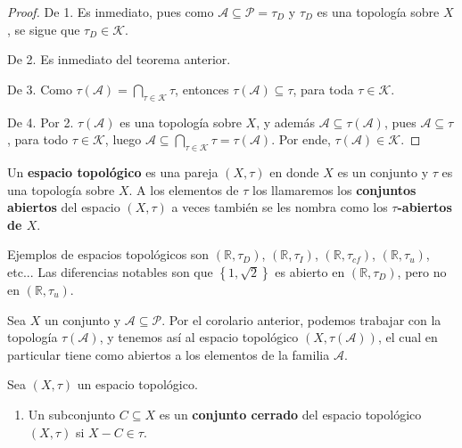 \documentclass[12pt]{report}
\theoremstyle{largebreak}
\begin{document}
    \begin{proof}
        De 1. Es inmediato, pues como $\mathcal{A}\subseteq\mathcal{P}=\tau_D$ y $\tau_D$ es una topología sobre $X$, se sigue que $\tau_D\in\mathcal{K}$.

        De 2. Es inmediato del teorema anterior.

        De 3. Como $\tau(\mathcal{A})=\bigcap_{\tau\in\mathcal{K}}\tau$, entonces $\tau(\mathcal{A})\subseteq\tau$, para toda $\tau\in\mathcal{K}$.

        De 4. Por 2. $\tau(\mathcal{A})$ es una topología sobre $X$, y además $\mathcal{A}\subseteq\tau(\mathcal{A})$, pues $\mathcal{A}\subseteq\tau$, para todo $\tau\in\mathcal{K}$, luego $\mathcal{A}\subseteq\bigcap_{\tau\in\mathcal{K}}\tau=\tau(\mathcal{A})$. Por ende, $\tau(\mathcal{A})\in\mathcal{K}$.
    \end{proof}

    \begin{mydef}
        Un \textbf{espacio topológico} es una pareja $(X,\tau)$ en donde $X$ es un conjunto y $\tau$ es una topología sobre $X$. A los elementos de $\tau$ los llamaremos los \textbf{conjuntos abiertos} del espacio $(X,\tau)$ a veces también se les nombra como los \textbf{$\tau$-abiertos de $X$}.
    \end{mydef}

    \begin{exa}
        Ejemplos de espacios topológicos son $(\mathbb{R},\tau_D)$, $(\mathbb{R},\tau_I)$, $(\mathbb{R},\tau_{cf})$, $(\mathbb{R},\tau_u)$, etc... Las diferencias notables son que $\left\{1,\sqrt{2} \right\}$ es abierto en $(\mathbb{R},\tau_D)$, pero no en $(\mathbb{R},\tau_u)$.
    \end{exa}

    Sea $X$ un conjunto y $\mathcal{A}\subseteq\mathcal{P}$. Por el corolario anterior, podemos trabajar con la topología $\tau(\mathcal{A})$, y tenemos así al espacio topológico $(X,\tau(\mathcal{A}))$, el cual en particular tiene como abiertos a los elementos de la familia $\mathcal{A}$.
    
    \begin{mydef}
        Sea $(X,\tau)$ un espacio topológico.
        \begin{enumerate}
            \item Un subconjunto $C\subseteq X$ es un \textbf{conjunto cerrado} del espacio topológico $(X,\tau)$ si $X-C\in\tau$.
        \end{enumerate}
    \end{mydef}
\end{document}
